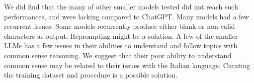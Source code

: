 We did find that the many of other smaller models tested did not reach such performances, and were lacking compared to ChatGPT. Many models had a few recurrent issues.
Some models recurrently produce either blank or non-valid characters as output. Reprompting might be a solution.
A few of the smaller LLMs has a few issues in their abilities to understand and follow topics with common sense reasoning.  We suggest that their poor ability to understand common sense may be related to their issues with the Italian language. Curating the training dataset and procedure  is a possible solution.

